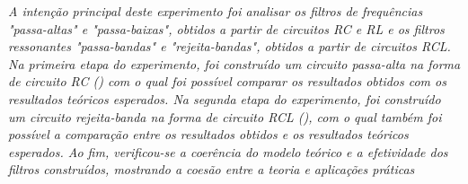 \textit{A intenção principal deste experimento foi analisar os filtros de frequências "passa-altas" e "passa-baixas", obtidos a partir de circuitos RC e RL e os filtros ressonantes "passa-bandas" e "rejeita-bandas", obtidos a partir de circuitos RCL.
Na primeira etapa do experimento, foi construído um circuito passa-alta na forma de circuito RC () com o qual foi possível comparar os resultados obtidos com os resultados teóricos esperados.
Na segunda etapa do experimento, foi construído um circuito rejeita-banda na forma de circuito RCL (), com o qual também foi possível a comparação entre os resultados obtidos e os resultados teóricos esperados.
Ao fim, verificou-se a coerência do modelo teórico e a efetividade dos filtros construídos, mostrando a coesão entre a teoria e aplicações práticas}